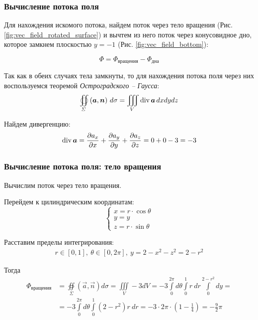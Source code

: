 \begin{frame}\frametitle{Вычисление потока поля}
	Для нахождения искомого потока, найдем поток через тело вращения
  (Рис. \ref{fig:vec_field_rotated_surface}) и вычтем из него поток
  через конусовидное дно, которое замкнем плоскостью \(y = -1\) (Рис. \ref{fig:vec_field_bottom}):

	\begin{equation*}
		\Phi = \Phi_{\text{вращения}} - \Phi_{\text{дна}}
	\end{equation*}

  Так как в обеих случаях тела замкнуты, то для нахождения
  потока поля через них воспользуемся теоремой \textit{Остроградского -- Гаусса}:
	\begin{equation*}
		\oiint\limits_{\Sigma}\left( \vec {a}, \vec {n} \right) \, d\sigma = \iiint\limits_V \Div \vec {a} \, dxdydz
	\end{equation*}

	Найдем дивергенцию:
	\begin{equation*}
		\Div \vec a = \frac{\partial a_x}{\partial x} +  \frac{\partial a_y}{\partial y} +  \frac{\partial a_z}{\partial z} = 0 + 0 - 3 = -3
	\end{equation*}
\end{frame}

\begin{frame}\frametitle{Вычисление потока поля: тело вращения}
  Вычислим поток через тело вращения.

  Перейдем к цилиндрическим координатам:
  \begin{equation*}
		\begin{cases}
			x = r \cdot \cos \theta \\
			y = y                   \\
			z = r \cdot \sin \theta
		\end{cases}
	\end{equation*}

Расставим пределы интегрирования:
	\begin{align*}
		r \in [0, 1], \
		\theta \in [0, 2\pi], \
		y = 2 - x^2 - z^2 = 2 - r^2
	\end{align*}
	
	Тогда
	\begin{align*}
    \Phi_{\text{вращения}} &= \oiint\limits_{\Sigma}\left( \vec {a}, \vec {n} \right) d\sigma = \iiint\limits_V -3 dV
		= -3 \int\limits_{0}^{2 \pi} d \theta
		\int\limits_{0}^{1} r~dr
		\int\limits_{0}^{2-r^2} dy = \\
    &= -3 \int\limits_{0}^{2 \pi} d \theta
		\int\limits_{0}^{1} (2-r^2)r~dr
		= -3 \cdot 2 \pi \cdot
		(1 - \frac{1}{4})
		= - \frac{9}{2}\pi
	\end{align*}
\end{frame}

